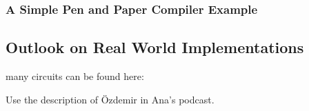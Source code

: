 

\subsubsection{A Simple Pen and Paper Compiler Example}

\subsection{Outlook on Real World Implementations}
many circuits can be found here:

Use the description of Özdemir in Ana's podcast. 

